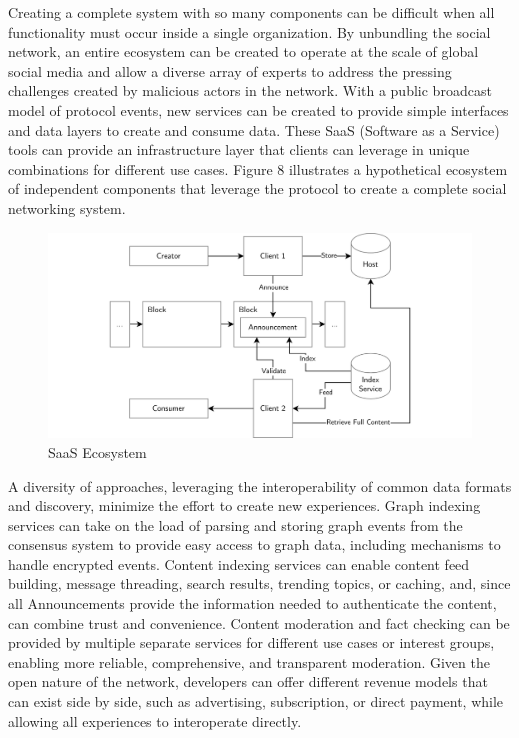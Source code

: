 \documentclass[12pt,letterpaper]{article}
\begin{document}
Creating a complete system with so many components can be difficult when all functionality
must occur inside a single organization. By unbundling the social network, an entire
ecosystem can be created to operate at the scale of global social media and allow a diverse
array of experts to address the pressing challenges created by malicious actors in the
network. With a public broadcast model of protocol events, new services can be created to
provide simple interfaces and data layers to create and consume data. These SaaS (Software
as a Service) tools can provide an infrastructure layer that clients can leverage in unique
combinations for different use cases. Figure 8 illustrates a hypothetical ecosystem of
independent components that leverage the protocol to create a complete social networking
system.

\begin{figure}
	\includegraphics[width=\linewidth]{figures/SaaS Ecosystem.png}
	\caption{SaaS Ecosystem}
	\label{fig:8}
\end{figure}

A diversity of approaches, leveraging the interoperability of common data formats and
discovery, minimize the effort to create new experiences. Graph indexing services can take
on the load of parsing and storing graph events from the consensus system to provide easy
access to graph data, including mechanisms to handle encrypted events. Content indexing
services can enable content feed building, message threading, search results, trending
topics, or caching, and, since all Announcements provide the information needed to
authenticate the content, can combine trust and convenience. Content moderation and fact
checking can be provided by multiple separate services for different use cases or interest
groups, enabling more reliable, comprehensive, and transparent moderation. Given the open
nature of the network, developers can offer different revenue models that can exist side by
side, such as advertising, subscription, or direct payment, while allowing all experiences
to interoperate directly.
\end{document}
